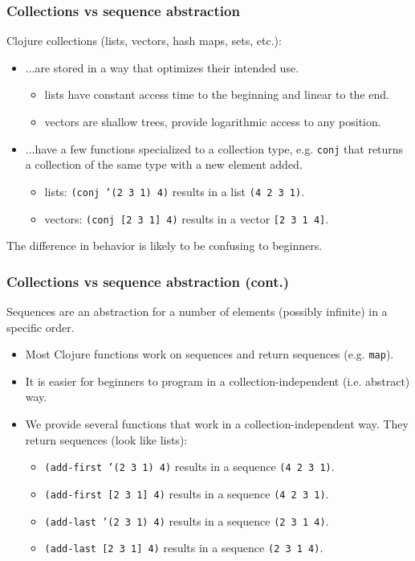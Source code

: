 \documentclass{beamer}
\begin{document}
\begin{frame}
\frametitle{Collections vs sequence abstraction}
Clojure collections (lists, vectors, hash maps, sets, etc.): 
\begin{itemize}
\item ...are stored in a way that optimizes their intended use. 
\begin{itemize}
\item lists have constant access time to the beginning and linear to the end. 
\item vectors are shallow trees, provide logarithmic access to any position.
\end{itemize}
\item ...have a few functions specialized to a collection type, e.g. {\tt conj} that returns a collection of the same type with a new element added. 
\begin{itemize}
\item lists: {\tt (conj '(2 3 1) 4)} results in a list {\tt (4 2 3 1)}.
\item vectors: {\tt (conj [2 3 1] 4)} results in a vector {\tt [2 3 1 4]}.
\end{itemize}
\end{itemize}
The difference in behavior is likely to be confusing to beginners. 
\end{frame}

\begin{frame}
\frametitle{Collections vs sequence abstraction (cont.)}
Sequences are an abstraction for a number of elements (possibly infinite) in a specific order. 
\begin{itemize}
\item Most Clojure functions work on sequences and return sequences (e.g. {\tt map}). 
\item It is easier for beginners to program in a collection-independent (i.e. abstract) way.
\item We provide several functions that work in a collection-independent way. They return sequences (look like lists):
\begin{itemize}
\item {\tt (add-first '(2 3 1) 4)} results in a sequence {\tt (4 2 3 1)}.
\item {\tt (add-first [2 3 1] 4)} results in a sequence {\tt (4 2 3 1)}.
\item {\tt (add-last '(2 3 1) 4)} results in a sequence {\tt (2 3 1 4)}.
\item {\tt (add-last [2 3 1] 4)} results in a sequence {\tt (2 3 1 4)}.
\end{itemize}
\end{itemize}
\end{frame}
\end{document}

